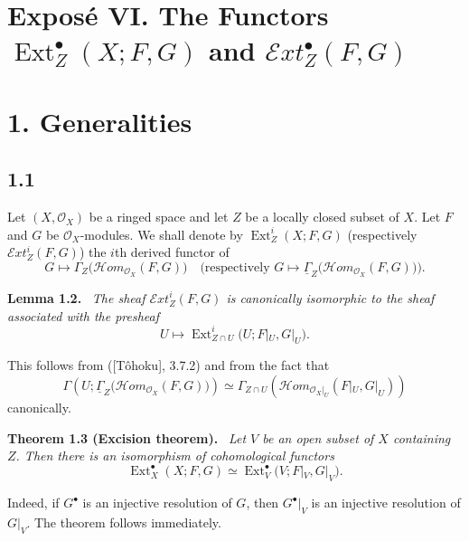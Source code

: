 \documentclass[11pt,a4paper]{article}
\newcommand{\OX}{\mathcal O_X}
\newcommand{\Ext}{\operatorname{Ext}}
\newcommand{\SheafExt}{\mathcal E\!xt}
\newcommand{\SheafHom}{\mathcal H\!om}
\newcommand{\SheafGamma}{\underline{\Gamma}}
\newenvironment{sgastatement}[1]{\par\addvspace{0.8\baselineskip}\noindent\textbf{#1.}\ \itshape}{\par}
\begin{document}
\section*{Expos\'e VI. The Functors $\Ext_Z^{\bullet}(X;F,G)$ and
$\SheafExt_Z^{\bullet}(F,G)$}

\section*{1. Generalities}
\subsection*{1.1}
Let $(X,\OX)$ be a ringed space and let $Z$ be a locally closed subset of
$X$. Let $F$ and $G$ be $\OX$-modules. We shall denote by
$\Ext_Z^i(X;F,G)$ (respectively $\SheafExt_Z^i(F,G)$) the $i$th derived
functor of
\[
 G\longmapsto \Gamma_Z\bigl(\SheafHom_{\OX}(F,G)\bigr)
 \quad\text{(respectively }G\longmapsto
 \SheafGamma_Z\bigl(\SheafHom_{\OX}(F,G)\bigr)\text{)}.
\]

\begin{sgastatement}{Lemma 1.2}
The sheaf $\SheafExt_Z^i(F,G)$ is canonically isomorphic to the sheaf
associated with the presheaf
\[
 U\longmapsto \Ext_{Z\cap U}^i\bigl(U;F|_U,G|_U\bigr).
\]
\end{sgastatement}

This follows from \textup{([T\^ohoku], 3.7.2)} and from the fact that
\[
 \Gamma\!\left(U;\SheafGamma_Z\bigl(\SheafHom_{\OX}(F,G)\bigr)\right)
 \simeq
 \Gamma_{Z\cap U}\!\left(\SheafHom_{\OX|_U}(F|_U,G|_U)\right)
\]
canonically.

\begin{sgastatement}{Theorem 1.3 (Excision theorem)}
Let $V$ be an open subset of $X$ containing $Z$. Then there is an
isomorphism of cohomological functors
\begin{equation}
 \Ext_X^{\bullet}(X;F,G)
 \simeq
 \Ext_V^{\bullet}\bigl(V;F|_V,G|_V\bigr).
 \tag{1.3.1}
\end{equation}
\end{sgastatement}

Indeed, if $G^{\bullet}$ is an injective resolution of $G$, then
$G^{\bullet}|_V$ is an injective resolution of $G|_V$. The theorem follows
immediately.
\end{document}
